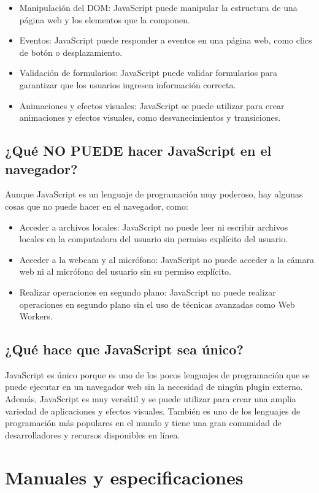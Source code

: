 \documentclass[executivepaper]{article}
\begin{document}
\begin{itemize}
\item Manipulación del DOM: JavaScript puede manipular la estructura de una página web y los elementos que la componen.
\item Eventos: JavaScript puede responder a eventos en una página web, como clics de botón o desplazamiento.
\item Validación de formularios: JavaScript puede validar formularios para garantizar que los usuarios ingresen información correcta.
\item Animaciones y efectos visuales: JavaScript se puede utilizar para crear animaciones y efectos visuales, como desvanecimientos y transiciones.
\end{itemize}

\subsection*{¿Qué NO PUEDE hacer JavaScript en el navegador?}
Aunque JavaScript es un lenguaje de programación muy poderoso, hay algunas cosas que no puede hacer en el navegador, como:

\begin{itemize}
\item Acceder a archivos locales: JavaScript no puede leer ni escribir archivos locales en la computadora del usuario sin permiso explícito del usuario.
\item Acceder a la webcam y al micrófono: JavaScript no puede acceder a la cámara web ni al micrófono del usuario sin su permiso explícito.
\item Realizar operaciones en segundo plano: JavaScript no puede realizar operaciones en segundo plano sin el uso de técnicas avanzadas como Web Workers.
\end{itemize}

\subsection*{¿Qué hace que JavaScript sea único?}
JavaScript es único porque es uno de los pocos lenguajes de programación que se puede ejecutar en un navegador web sin la necesidad de ningún plugin externo. Además, JavaScript es muy versátil y se puede utilizar para crear una amplia variedad de aplicaciones y efectos visuales. También es uno de los lenguajes de programación más populares en el mundo y tiene una gran comunidad de desarrolladores y recursos disponibles en línea.

\newpage
\section{Manuales y especificaciones}
\end{document}
